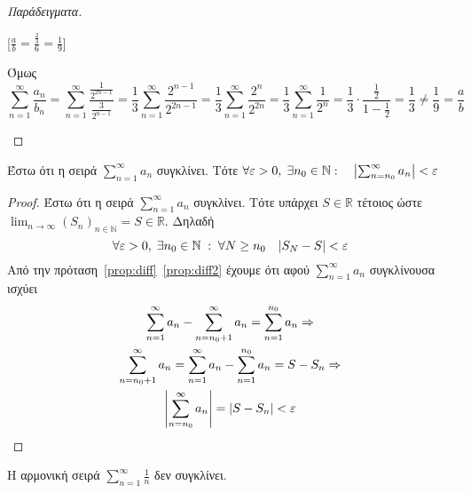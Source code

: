 \documentclass[a4paper,table]{report}
\begin{document}
\begin{rem}
\begin{proof}[Παράδειγματα]
\begin{enumerate}[i)]
                [$ \frac{a}{b} = \frac{\frac{2}{3}}{6} = \frac{1}{9} $]

                Όμως 
                \[
                    \sum_{n=1}^{\infty} \frac{a_{n}}{b_{n}} = \sum_{n=1}^{\infty} 
                    \frac{\frac{1}{2^{2n-1}}}{\frac{3}{2^{n-1}}} = 
                    \frac{1}{3} \sum_{n=1}^{\infty} \frac{2^{n-1}}{2^{2n-1}} = 
                    \frac{1}{3} \sum_{n=1}^{\infty} \frac{2^{n}}{2^{2n}} = 
                    \frac{1}{3} \sum_{n=1}^{\infty} \frac{1}{2^{n}} = \frac{1}{3} \cdot 
                    \frac{\frac{1}{2}}{1 - \frac{1}{2}} = \frac{1}{3} \neq \frac{1}{9} 
                    = \frac{a}{b}
                \] 
        \end{enumerate}

    \end{proof}
\end{rem}

\begin{mybox3}
\begin{prop}
Έστω ότι η σειρά $ \sum_{n=1}^{\infty} a_{n} $ συγκλίνει. Τότε 
    $ \forall \varepsilon >0, \; \exists n_{0} \in \mathbb{N} :
\quad \abs{\sum_{n= n_{0}}^{\infty} a_{n}} < \varepsilon $
\end{prop}
\end{mybox3}

\begin{proof}
\item {}
    Έστω ότι η σειρά $ \sum_{n=1}^{\infty} a_{n} $ συγκλίνει. Τότε υπάρχει 
    $ S \in \mathbb{R} $ τέτοιος ώστε $ \lim_{n \to \infty} 
    {(S_{n})}_{n \in \mathbb{N}} = S \in \mathbb{R} $. Δηλαδή 
    \[
        \forall \varepsilon >0, \; \exists n_{0} \in \mathbb{N} \; : \; 
        \forall N \geq n_{0} \quad \abs{S_{N}-S} < \varepsilon 
    \] 
    Από την πρόταση~\ref{prop:diff}~\ref{prop:diff2} έχουμε ότι αφού 
    $ \sum_{n=1}^{\infty} a_{n} $ συγκλίνουσα ισχύει
    \begin{gather*}
        \sum_{n=1}^{\infty} a_{n} - \sum_{n= n_{0}+1}^{\infty} a_{n} = 
        \sum_{n= 1}^{n_{0}} a_{n} \Rightarrow \\ 
        \sum_{n= n_{0}+1}^{\infty} a_{n} = \sum_{n=1}^{\infty} a_{n} - 
        \sum_{n=1}^{n_{0}} a_{n} = S - S_{n} \Rightarrow \\
        \abs{\sum_{n= n_{0}}^{\infty} a_{n}} = \abs{S - S_{n}} < \varepsilon
    \end{gather*} 
\end{proof}

\begin{mybox3}
\begin{prop}
Η αρμονική σειρά $ \sum_{n=1}^{\infty} \frac{1}{n} $ δεν συγκλίνει.
\end{prop}
\end{mybox3}
\end{document}
